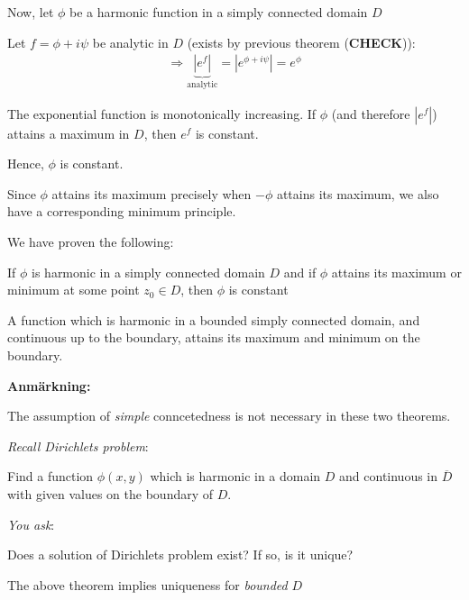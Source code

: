 \par\bigskip
\noindent Now, let $\phi$ be a harmonic function in a simply connected domain $D$\par
\noindent Let $f = \phi+i\psi$ be analytic in $D$ (exists by previous theorem (\textbf{CHECK})):
\begin{equation*}
  \begin{gathered}
    \Rightarrow \underbrace{\left|e^f\right|}_{\text{analytic}} = \left|e^{\phi+i\psi}\right| = e^{\phi}
  \end{gathered}
\end{equation*}
\par\bigskip
\noindent The exponential function is monotonically increasing. If $\phi$  (and therefore $\left|e^f\right|$) attains a maximum in $D$, then $e^f$ is constant.\par
\noindent Hence, $\phi$ is constant.
\par\bigskip
\noindent Since $\phi$ attains its maximum precisely when $-\phi$ attains its maximum, we also have a corresponding minimum principle.
\par\bigskip
\noindent We have proven the following:
\par\bigskip
\begin{theo}[]{}
  If $\phi$ is harmonic in a simply connected domain $D$ and if $\phi$ attains its maximum or minimum at some point $z_0\in D$, then $\phi$ is constant
\end{theo}
\par\bigskip
\begin{theo}[]{}
  A function which is harmonic in a bounded simply connected domain, and continuous up to the boundary, attains its maximum and minimum on the boundary. 
\end{theo}
\par\bigskip
\noindent\textbf{Anmärkning:}\par
\noindent The assumption of \textit{simple} conncetedness is not necessary in these two theorems.
\par\bigskip
\noindent \textit{Recall Dirichlets problem}:\par
Find a function $\phi(x,y)$ which is harmonic in a domain $D$ and continuous in $\overline{D}$ with given values on the boundary of $D$.
\par\bigskip
\noindent\textit{You ask}:\par
Does a solution of Dirichlets problem exist? If so, is it unique?\par
\noindent The above theorem implies uniqueness for \textit{bounded} $D$

